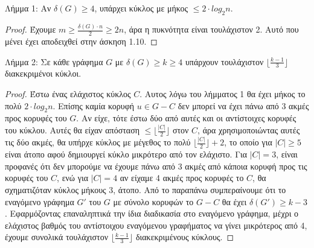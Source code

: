 \documentclass[a4paper, oneside, 11pt]{article}
\theoremstyle{definition}
\begin{document}
\begin{enumerate}
Λήμμα 1: Αν $\delta(G)\geq 4$, υπάρχει κύκλος με μήκος $\leq 2\cdot log_2 n$.
\begin{proof}
Έχουμε $m\geq \frac{\delta(G)\cdot n}{2}\geq 2n$, άρα η πυκνότητα είναι τουλάχιστον 2. Αυτό που μένει έχει αποδειχθεί στην άσκηση 1.10.
\end{proof}

Λήμμα 2: Σε κάθε γράφημα $G$ με $\delta(G)\geq k\geq 4$ υπάρχουν τουλάχιστον $\lfloor \frac{k-1}{3}\rfloor$ διακεκριμένοι κύκλοι.
\begin{proof}
Έστω ένας ελάχιστος κύκλος $C$. Αυτος λόγω του λήμματος 1 θα έχει μήκος το πολύ $2\cdot log_2 n$. Επίσης καμία κορυφή $u\in G-C$ δεν μπορεί να έχει πάνω από 3 ακμές προς κορυφές του $G$.
Αν είχε, τότε έστω δύο από αυτές και οι αντίστοιχες κορυφές του κύκλου. Αυτές θα είχαν απόσταση $\leq \lfloor \frac{|C|}{2}\rfloor$ στον $C$, άρα χρησιμοποιώντας αυτές τις δύο ακμές, 
θα υπήρχε κύκλος με μέγεθος το πολύ
$\lfloor\frac{|C|}{2}\rfloor + 2$, το οποίο για $|C|\geq 5$ είναι άτοπο αφού δημιουργεί κύκλο μικρότερο από τον ελάχιστο. Για $|C|=3$, είναι προφανές ότι δεν μπορούμε να έχουμε πάνω από 3
ακμές από κάποια κορυφή προς τις κορυφές του $C$, ενώ για $|C|=4$ αν είχαμε 4 ακμές προς κορυφές το $C$, θα σχηματιζόταν κύκλος μήκους 3, άτοπο.
Από το παραπάνω συμπεραίνουμε ότι το εναγόμενο γράφημα $G'$ του $G$ με σύνολο κορυφών το $G-C$ θα έχει $\delta(G') \geq k-3$. Εφαρμόζοντας επαναληπτικά την ίδια διαδικασία στο εναγόμενο 
γράφημα, μέχρι ο ελάχιστος
βαθμός του αντίστοιχου εναγόμενου γραφήματος να γίνει μικρότερος από 4, έχουμε συνολικά τουλάχιστον $\lfloor \frac{k-1}{3}\rfloor$ διακεκριμένους κύκλους.
\end{proof}

\end{enumerate}
\end{document}
